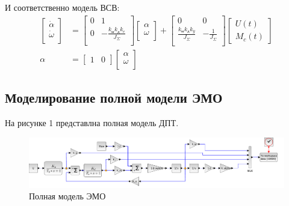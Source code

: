 \documentclass[a4paper, 12pt]{article}
\begin{document}
И соответственно модель ВСВ: 
\begin{align}
    \begin{bmatrix}
        \dot{\alpha} \\
        \dot{\omega} \\
    \end{bmatrix} & = 
    \begin{bmatrix}
        0 & 1 \\
        0 & -\frac{k_\text{м}k_\text{д}k_e}{J_\Sigma} \\
    \end{bmatrix}
    \begin{bmatrix}
        \alpha \\
        \omega \\
    \end{bmatrix} + 
    \begin{bmatrix}
        0 & 0 \\
        \frac{k_\text{м}k_\text{д}k_y}{J_\Sigma} & -\frac{1}{J_\Sigma} \\
    \end{bmatrix}
    \begin{bmatrix}
        U(t) \\
        M_c(t)
    \end{bmatrix} \\
    \alpha & = 
    \begin{bmatrix}
        1 & 0 
    \end{bmatrix}
    \begin{bmatrix}
        \alpha \\
        \omega \\
    \end{bmatrix}
\end{align}

\newpage
\begin{center}
\section{Моделирование полной модели ЭМО}
\end{center}

На рисунке 1 представлна полная модель ДПТ.
\begin{figure}[h!]
    \centering
    \includegraphics[width = \textwidth]{images/FullModel/full-model.pdf}
    \caption{Полная модель ЭМО}
\end{figure}
\end{document}
